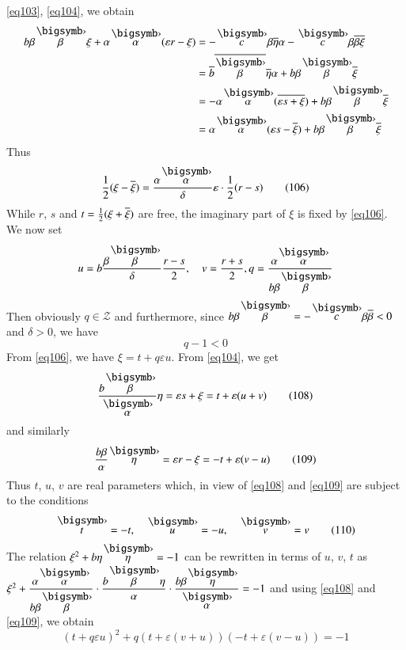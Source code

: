 \eqref{eq103}, \eqref{eq104}, we obtain
\begin{align*}
b\beta\overdot{\beta}\xi+\alpha\overdot{\alpha}(\varepsilon r-\xi) &=
-\overdot{c}\beta\ob{\eta}\alpha-\overdot{c}\beta\ob{\beta}\ob{\xi}\\
&=
\ob{b}\ob{\overdot{\beta}}\ob{\eta}\alpha+b\beta\overdot{\beta}\ob{\xi}\\
&= -\alpha\overdot{\alpha}(\overline{\varepsilon
  s+\xi})+b\beta\overdot{\beta}\ob{\xi}\\ 
&= \alpha\overdot{\alpha}(\varepsilon
s-\overline{\xi})+b\beta\overdot{\beta}\ob{\xi} 
\end{align*}
Thus
\begin{equation*}
\frac{1}{2}(\xi-\ob{\xi})=\frac{\alpha\overdot{\alpha}}{\delta}\varepsilon\cdot
\frac{1}{2}(r-s)\tag{106}\label{eq106} 
\end{equation*}
While $r$, $s$ and $t=\frac{1}{2}(\xi+\overline{\xi})$ are free, the
imaginary part of $\xi$ is fixed by \eqref{eq106}. We now set
$$
u=b\frac{\beta\overdot{\beta}}{\delta}\frac{r-s}{2},\quad
v=\frac{r+s}{2},
q=\frac{\alpha\overdot{\alpha}}{b\beta\overdot{\beta}}
$$
Then obviously $q\in \mathscr{Z}$ and furthermore, since
$b\beta\overdot{\beta}=-\overdot{c}\beta\ob{\beta}<0$ and $\delta>0$,
we have
\begin{equation*}
q-1<0\tag{107}\label{eq107}
\end{equation*}
From \eqref{eq106}, we have $\xi=t+q\varepsilon u$. From \eqref{eq104}, we
get 
\begin{equation*}
\frac{b\overdot{\beta}}{\overdot{\alpha}}\eta=\varepsilon
s+\xi=t+\varepsilon(u+v)\tag{108}\label{eq108} 
\end{equation*}\pageoriginale
and similarly
\begin{equation*}
\frac{b\beta}{\alpha}\overdot{\eta}=\varepsilon
r-\xi=-t+\varepsilon(v-u)\tag{109}\label{eq109} 
\end{equation*}
Thus $t$, $u$, $v$ are real parameters which, in view of \eqref{eq108}
and \eqref{eq109} are subject to the conditions
\begin{equation*}
\overdot{t}=-t,\quad \overdot{u}=-u,\quad 
\overdot{v}=v\tag{110}\label{eq110}
\end{equation*}
The relation $\xi^{2}+b\eta\overdot{\eta}=-1$ can be rewritten in
terms of $u$, $v$, $t$ as
$\xi^{2}+\dfrac{\alpha\overdot{\alpha}}{b\beta\overdot{\beta}}\cdot
\dfrac{b\overdot{\beta}\eta}{\alpha}\cdot
\dfrac{b\beta\overdot{\eta}}{\overdot{\alpha}}=-1$ and using
\eqref{eq108} and \eqref{eq109}, we obtain
$$
(t+q\varepsilon u)^{2}+q(t+\varepsilon(v+u))
(-t+\varepsilon(v-u))=-1
$$
